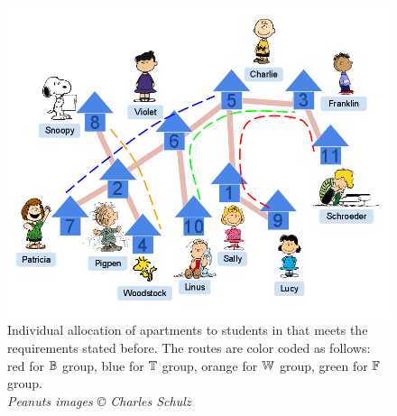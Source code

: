\begin{figure}[htbp]
  \includegraphics[scale=0.5]{../img/3_infinite_loop.png}
  \caption[\figtabsize Solution to the student accommodation
  problem.]{\figtabsize Individual allocation of apartments to
    students in {\residenceblock} that meets the requirements stated
    before.  The routes are color coded as follows: red for
    \textcolor{red}{$\mathbb{B}$} group, blue for \textcolor{blue}{$\mathbb{T}$}
    group, orange for \textcolor{yellow}{$\mathbb{W}$} group, green for
    \textcolor{green}{$\mathbb{F}$} group.\\ {\tiny {\em Peanuts images
        {\copyright} Charles Schulz}}}%
  \label{fig:streetmappathpeople}
\end{figure} 

